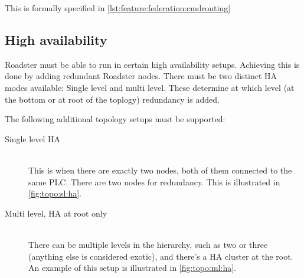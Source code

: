 This is formally specified in \autoref{lst:feature:federation:cmdrouting}


\subsection{High availability}
Roadster must be able to run in certain high availability setups. Achieving
this is done by adding redundant Roadster nodes. There must be two distinct
\gls{HA} modes available: Single level and multi level. These determine at
which level (at the bottom or at root of the toplogy) redundancy is added.

The following additional topology setups must be supported:
\begin{description}
	\item [ Single level \gls{HA} ] \hfill\\
		This is when there are exactly two nodes, both of them
		connected to the same PLC. There are two nodes for redundancy. This is illustrated in
		\autoref{fig:topo:sl:ha}.

	\item [ Multi level, \gls{HA} at root only ] \hfill\\
		There can be multiple levels in the hierarchy, such as two or
		three (anything else is considered exotic), and there's a HA
		cluster at the root. An example of this setup is illustrated in
		\autoref{fig:topo:ml:ha}.
\end{description}

